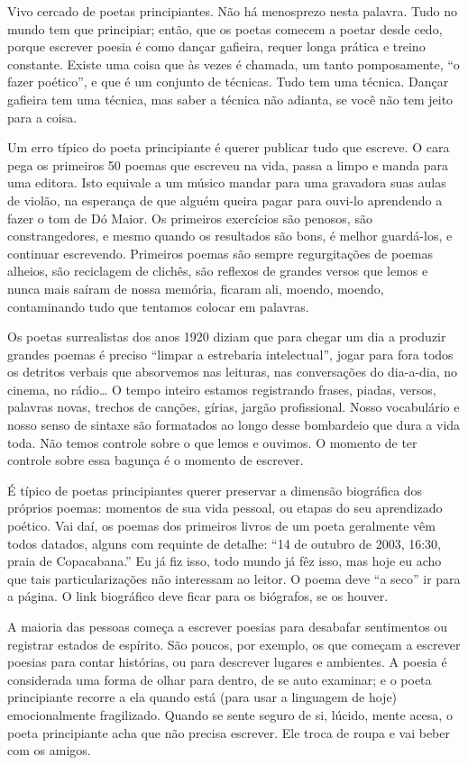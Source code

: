 Vivo cercado de poetas principiantes. Não há menosprezo nesta palavra.
Tudo no mundo tem que principiar; então, que os poetas comecem a
poetar desde cedo, porque escrever poesia é como dançar gafieira,
requer longa prática e treino constante.  Existe uma coisa que às
vezes é chamada, um tanto pomposamente, “o fazer poético”, e que é um
conjunto de técnicas. Tudo tem uma técnica. Dançar gafieira tem uma
técnica, mas saber a técnica não adianta, se você não tem jeito para
a coisa.  

Um erro típico do poeta principiante é querer publicar tudo que
escreve. O cara pega os primeiros 50 poemas que escreveu na vida,
passa a limpo e manda para uma editora. Isto equivale a um músico
mandar para uma gravadora suas aulas de violão, na esperança de que
alguém queira pagar para ouvi-lo aprendendo a fazer o tom de Dó
Maior.  Os primeiros exercícios são penosos, são constrangedores, e
mesmo quando os resultados são bons, é melhor guardá-los, e continuar
escrevendo.  Primeiros poemas são sempre regurgitações de poemas
alheios, são reciclagem de clichês, são reflexos de grandes versos
que lemos e nunca mais saíram de nossa memória, ficaram ali, moendo,
moendo, contaminando tudo que tentamos colocar em palavras.

Os poetas surrealistas dos anos 1920 diziam que para chegar um dia a
produzir grandes poemas é preciso “limpar a estrebaria intelectual”,
jogar para fora todos os detritos verbais que absorvemos nas
leituras, nas conversações do dia-a-dia, no cinema, no rádio…  O
tempo inteiro estamos registrando frases, piadas, versos, palavras
novas, trechos de canções, gírias, jargão profissional.  Nosso
vocabulário e nosso senso de sintaxe são formatados ao longo desse
bombardeio que dura a vida toda. Não temos controle sobre o que lemos
e ouvimos. O momento de ter controle sobre essa bagunça é o momento
de escrever.

É típico de poetas principiantes querer preservar a dimensão
biográfica dos próprios poemas: momentos de sua vida pessoal, ou
etapas do seu aprendizado poético. Vai daí, os poemas dos primeiros
livros de um poeta geralmente vêm todos datados, alguns com requinte
de detalhe: “14 de outubro de 2003, 16:30, praia de Copacabana.” Eu
já fiz isso, todo mundo já fêz isso, mas hoje eu acho que tais
particularizações não interessam ao leitor. O poema deve “a seco” ir
para a página. O link biográfico deve ficar para os biógrafos, se os
houver.

A maioria das pessoas começa a escrever poesias para desabafar
sentimentos ou registrar estados de espírito. São poucos, por
exemplo, os que começam a escrever poesias para contar histórias, ou
para descrever lugares e ambientes. A poesia é considerada uma forma
de olhar para dentro, de se auto examinar; e o poeta principiante
recorre a ela quando está (para usar a linguagem de hoje)
emocionalmente fragilizado. Quando se sente seguro de si, lúcido,
mente acesa, o poeta principiante acha que não precisa escrever. Ele
troca de roupa e vai beber com os amigos.

